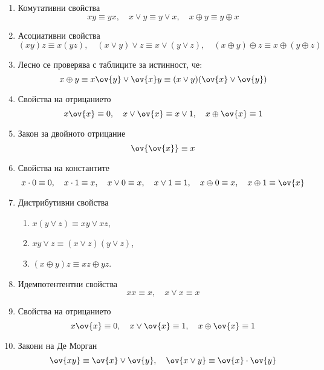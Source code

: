 \begin{enumerate}[1)]
\item
  Комутативни свойства
  \[xy \equiv yx,\quad x\vee y \equiv y\vee x,\quad x\oplus y \equiv y\oplus x\]
\item
  Асоциативни свойства
  \[(xy)z \equiv x(yz),\quad (x\vee y)\vee z \equiv x\vee (y\vee z),\quad (x\oplus y)\oplus z \equiv x\oplus (y\oplus z)\]
\item
  Лесно се проверява с таблиците за истинност, че:
  \[x\oplus y \equiv x\ov{y}\vee \ov{x}y \equiv (x\vee y)(\ov{x}\vee\ov{y})\]
\item
  Свойства на отрицанието
  \[x\ov{x} \equiv 0, \quad x\vee\ov{x} \equiv x\vee 1,\quad x\oplus\ov{x} \equiv 1\]
\item
  Закон за двойното отрицание
  \[\ov{\ov{x}} \equiv x\]
\item
  Свойства на константите
  \[x\cdot 0 \equiv 0, \quad x\cdot 1 \equiv x,\quad x\vee 0 \equiv x,\quad x\vee 1 \equiv 1,\quad x\oplus 0 \equiv x, \quad x\oplus 1 \equiv \ov{x}\]
\item
  Дистрибутивни свойства
  \begin{enumerate}[]
  \item
    $x(y\vee z) \equiv xy \vee xz$,
  \item
    $xy \vee z \equiv (x\vee z)(y\vee z)$,
  \item
    $(x\oplus y)z \equiv xz \oplus yz$.
  \end{enumerate}
\item
  Идемпотентентни свойства
  \[xx \equiv x, \quad x\vee x \equiv x\]
\item
  Свойства на отрицанието
  \[x\ov{x} \equiv 0, \quad x\vee\ov{x} \equiv 1, \quad x\oplus\ov{x} \equiv 1\]
\item
  Закони на Де Морган
  \[\ov{xy} \equiv \ov{x}\vee\ov{y}, \quad \ov{x\vee y} \equiv \ov{x}\cdot\ov{y}\]
\end{enumerate}

